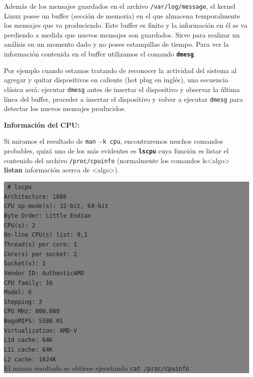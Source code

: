 \documentclass[12pt]{article}
\begin{document}
Además de los mensajes guardados en el archivo \texttt{/var/log/message}, el kernel Linux posee un buffer 
(sección de memoria) en el que almacena temporalmente los mensajes que va produciendo. Este buffer es 
finito y la información en él se va perdiendo a medida que nuevos mensajes son guardados. Sirve para realizar 
un análisis en un momento dado y no posee estampillas de tiempo. Para ver la información contenida en el 
buffer utilizamos el comando \texttt{\textbf{dmesg}}. 

Por ejemplo cuando estamos tratando de reconocer la actividad del sistema al agregar y quitar 
dispositivos en caliente (hot plug en inglés), una secuencia clásica será: ejecutar \texttt{dmesg} 
antes de insertar el dispositivo y observar la última línea del buffer, proceder a insertar 
el dispositivo y volver a ejecutar \texttt{dmesg} para detectar los nuevos mensajes producidos. 

\textbf{Información del CPU:}

Si miramos el resultado de \texttt{man -k cpu}, encontraremos muchos comandos probables, quizá 
uno de los más evidentes es \textbf{\texttt{lscpu}} cuya función es listar el contenido del archivo 
\texttt{/proc/cpuinfo} (normalmente los comandos ls{\textless}algo\textgreater  
\textbf{listan} información acerca de {\textless}algo\textgreater).

\colorbox{grey}{\parbox[t]{0.95\linewidth}{ \vspace*{0.5cm} { 
{\tt
\# lscpu \\
Architecture:          i686\\
CPU op-mode(s):        32-bit, 64-bit\\
Byte Order:            Little Endian\\
CPU(s):                2\\
On-line CPU(s) list:   0,1\\
Thread(s) per core:    1\\
Core(s) per socket:    2\\
Socket(s):             1\\
Vendor ID:             AuthenticAMD\\
CPU family:            16\\
Model:                 6\\
Stepping:              3\\
CPU MHz:               800.000\\
BogoMIPS:              5586.01\\
Virtualization:        AMD-V\\
L1d cache:             64K\\
L1i cache:             64K\\
L2 cache:              1024K\\
}
El mismo resultado se obtiene ejecutando \texttt{cat /proc/cpuinfo}
} \vspace*{0.5cm} } } 
\end{document}
